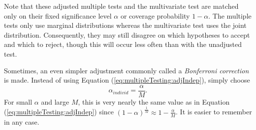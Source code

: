 \documentclass[letterpaper,12pt,oneside,final]{article}
\begin{document}

Note that these adjusted multiple tests and the multivariate test are matched only on their fixed significance level $\alpha$ or coverage probability $1 - \alpha$. The multiple tests only use marginal distributions whereas the multivariate test uses the joint distribution. Consequently, they may still disagree on which hypotheses to accept and which to reject, %
though this will occur less often than with the unadjusted test.

Sometimes, an even simpler adjustment commonly called a \emph{Bonferroni correction} is made. Instead of using Equation (\ref{eq:multipleTesting:adjIndep}), simply choose
\begin{equation}
\alpha_{individ} = \frac{\alpha}{M}.
\label{eq:multipleTesting:adjIndepApprox}
\end{equation}
For small $\alpha$ and large $M$, this is very nearly the same value as in Equation (\ref{eq:multipleTesting:adjIndep}) since $(1 - \alpha)^\frac{1}{M} \approx 1 - \frac{\alpha}{M}$.  It is easier to remember in any case.
\end{document}
